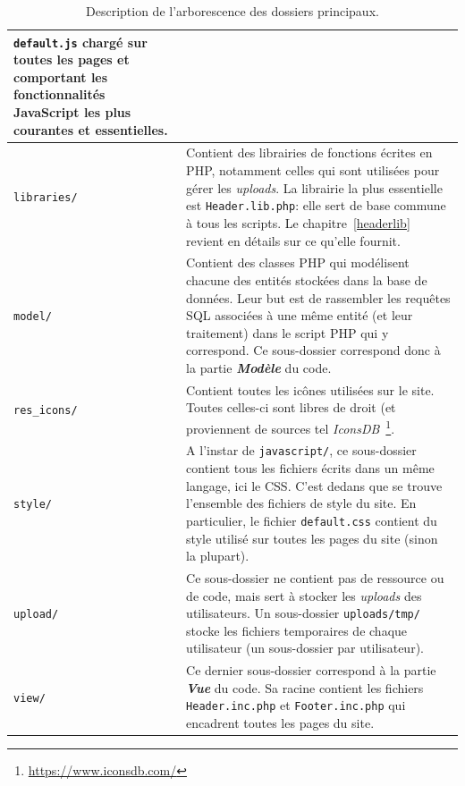 \begin{savenotes}
\begin{table}[!t]
\begin{tabular}{|l|p{}|}
                         \texttt{default.js} chargé sur toutes les pages et comportant les 
                         fonctionnalités JavaScript les plus courantes et essentielles.\\
  \hline
  \texttt{libraries/} & Contient des librairies de fonctions écrites en PHP, notamment celles qui 
                        sont utilisées pour gérer les \textit{uploads}. La librairie la plus 
                        essentielle est \texttt{Header.lib.php}: elle sert de base commune à tous 
                        les scripts. Le chapitre~\ref{headerlib} revient en détails sur ce qu'elle 
                        fournit.\\%
  \hline
  \texttt{model/} & Contient des classes PHP qui modélisent chacune des entités stockées dans la 
                    base de données. Leur but est de rassembler les requêtes SQL associées à une 
                    même entité (et leur traitement) dans le script PHP qui y correspond. Ce 
                    sous-dossier correspond donc à la partie \textbf{\textit{Modèle}} du code.\\
  \hline
  \texttt{res\_icons/} & Contient toutes les icônes utilisées sur le site. Toutes celles-ci sont 
                        libres de droit (et proviennent de sources tel 
                        \textit{IconsDB}~\footnote{\url{https://www.iconsdb.com/}}.\\
  \hline
  \texttt{style/} & A l'instar de \texttt{javascript/}, ce sous-dossier contient tous les fichiers 
                    écrits dans un même langage, ici le CSS. C'est dedans que se trouve l'ensemble 
                    des fichiers de style du site. En particulier, le fichier \texttt{default.css} 
                    contient du style utilisé sur toutes les pages du site (sinon la plupart).\\
  \hline
  \texttt{upload/} & Ce sous-dossier ne contient pas de ressource ou de code, mais sert à stocker 
                     les \textit{uploads} des utilisateurs. Un sous-dossier \texttt{uploads/tmp/} 
                     stocke les fichiers temporaires de chaque utilisateur (un sous-dossier par 
                     utilisateur).\\
  \hline
  \texttt{view/} & Ce dernier sous-dossier correspond à la partie \textbf{\textit{Vue}} du code. 
                   Sa racine contient les fichiers \texttt{Header.inc.php} et 
                   \texttt{Footer.inc.php} qui encadrent toutes les pages du site.\\ %
  \hline
\end{tabular}
\caption{Description de l'arborescence des dossiers principaux.}
\label{intro.tab.folders}
\end{table}
\end{savenotes}
